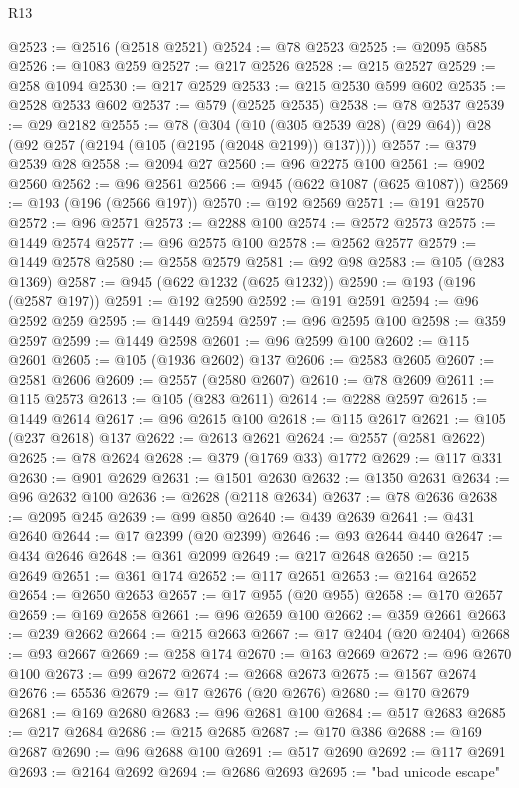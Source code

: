 \begin{lexlean}{R13}
\begin{coremodule}
@2523 := @2516 (@2518 @2521)
@2524 := @78 @2523
@2525 := @2095 @585
@2526 := @1083 @259
@2527 := @217 @2526
@2528 := @215 @2527
@2529 := @258 @1094
@2530 := @217 @2529
@2533 := @215 @2530 @599 @602
@2535 := @2528 @2533 @602
@2537 := @579 (@2525 @2535)
@2538 := @78 @2537
@2539 := @29 @2182
@2555 := @78
    (@304 (@10 (@305 @2539 @28) (@29 @64)) @28 (@92 @257 (@2194 (@105 (@2195 (@2048 @2199)) @137))))
@2557 := @379 @2539 @28
@2558 := @2094 @27
@2560 := @96 @2275 @100
@2561 := @902 @2560
@2562 := @96 @2561
@2566 := @945 (@622 @1087 (@625 @1087))
@2569 := @193 (@196 (@2566 @197))
@2570 := @192 @2569
@2571 := @191 @2570
@2572 := @96 @2571
@2573 := @2288 @100
@2574 := @2572 @2573
@2575 := @1449 @2574
@2577 := @96 @2575 @100
@2578 := @2562 @2577
@2579 := @1449 @2578
@2580 := @2558 @2579
@2581 := @92 @98
@2583 := @105 (@283 @1369)
@2587 := @945 (@622 @1232 (@625 @1232))
@2590 := @193 (@196 (@2587 @197))
@2591 := @192 @2590
@2592 := @191 @2591
@2594 := @96 @2592 @259
@2595 := @1449 @2594
@2597 := @96 @2595 @100
@2598 := @359 @2597
@2599 := @1449 @2598
@2601 := @96 @2599 @100
@2602 := @115 @2601
@2605 := @105 (@1936 @2602) @137
@2606 := @2583 @2605
@2607 := @2581 @2606
@2609 := @2557 (@2580 @2607)
@2610 := @78 @2609
@2611 := @115 @2573
@2613 := @105 (@283 @2611)
@2614 := @2288 @2597
@2615 := @1449 @2614
@2617 := @96 @2615 @100
@2618 := @115 @2617
@2621 := @105 (@237 @2618) @137
@2622 := @2613 @2621
@2624 := @2557 (@2581 @2622)
@2625 := @78 @2624
@2628 := @379 (@1769 @33) @1772
@2629 := @117 @331
@2630 := @901 @2629
@2631 := @1501 @2630
@2632 := @1350 @2631
@2634 := @96 @2632 @100
@2636 := @2628 (@2118 @2634)
@2637 := @78 @2636
@2638 := @2095 @245
@2639 := @99 @850
@2640 := @439 @2639
@2641 := @431 @2640
@2644 := @17 @2399 (@20 @2399)
@2646 := @93 @2644 @440
@2647 := @434 @2646
@2648 := @361 @2099
@2649 := @217 @2648
@2650 := @215 @2649
@2651 := @361 @174
@2652 := @117 @2651
@2653 := @2164 @2652
@2654 := @2650 @2653
@2657 := @17 @955 (@20 @955)
@2658 := @170 @2657
@2659 := @169 @2658
@2661 := @96 @2659 @100
@2662 := @359 @2661
@2663 := @239 @2662
@2664 := @215 @2663
@2667 := @17 @2404 (@20 @2404)
@2668 := @93 @2667
@2669 := @258 @174
@2670 := @163 @2669
@2672 := @96 @2670 @100
@2673 := @99 @2672
@2674 := @2668 @2673
@2675 := @1567 @2674
@2676 := 65536
@2679 := @17 @2676 (@20 @2676)
@2680 := @170 @2679
@2681 := @169 @2680
@2683 := @96 @2681 @100
@2684 := @517 @2683
@2685 := @217 @2684
@2686 := @215 @2685
@2687 := @170 @386
@2688 := @169 @2687
@2690 := @96 @2688 @100
@2691 := @517 @2690
@2692 := @117 @2691
@2693 := @2164 @2692
@2694 := @2686 @2693
@2695 := "bad unicode escape"

\end{coremodule}
\end{lexlean}
